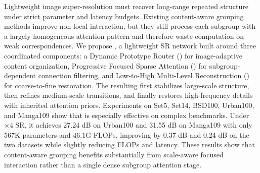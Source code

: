 Lightweight image super-resolution must recover long-range repeated structure under strict parameter and latency budgets. Existing content-aware grouping methods improve non-local interaction, but they still process each subgroup with a largely homogeneous attention pattern and therefore waste computation on weak correspondences. We propose \method{}, a lightweight SR network built around three coordinated components: a Dynamic Prototype Router (\dpr{}) for image-adaptive content organization, Progressive Focused Sparse Attention (\pfsa{}) for subgroup-dependent connection filtering, and Low-to-High Multi-Level Reconstruction (\lmr{}) for coarse-to-fine restoration. The resulting \moduleName{} first stabilizes large-scale structure, then refines medium-scale transitions, and finally restores high-frequency details with inherited attention priors. Experiments on Set5, Set14, BSD100, Urban100, and Manga109 show that \method{} is especially effective on complex benchmarks. Under \(\times4\) SR, it achieves 27.24 dB on Urban100 and 31.55 dB on Manga109 with only 567K parameters and 46.1G FLOPs, improving \baseline{} by 0.37 dB and 0.24 dB on the two datasets while slightly reducing FLOPs and latency. These results show that content-aware grouping benefits substantially from scale-aware focused interaction rather than a single dense subgroup attention stage.

